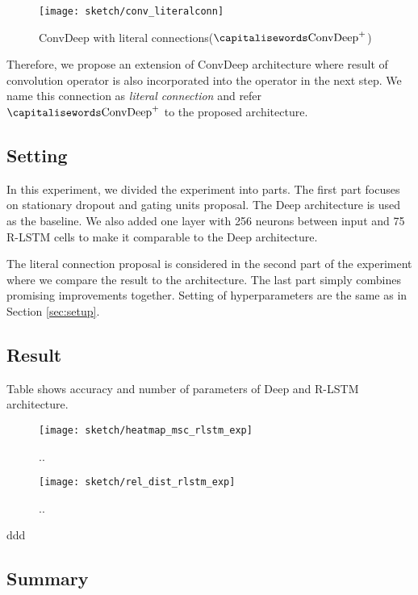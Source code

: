  \begin{figure}[h]
\centering
\texttt{[image: sketch/conv\_literalconn]}
\caption{ConvDeep with literal connections($\rnncell{ConvDeep}^+$)} 
\label{fig:conv_literalconn}
\end{figure}

Therefore, we propose an extension of ConvDeep architecture where result of convolution operator is also incorporated into the operator in the next step. We name this connection as \textit{literal connection} and refer $\rnncell{ConvDeep}^+$ to the proposed architecture. 

\subsection{Setting}
In this experiment, we divided the experiment into  parts. The first part focuses on stationary dropout and gating units proposal. The Deep architecture is used as the baseline. We also added one layer with 256 neurons between input and  75 R-LSTM cells to make it comparable to the Deep architecture.

The literal connection proposal is considered in the second part of the experiment where we compare the result to the  architecture.  The last part simply combines promising improvements together.  Setting of hyperparameters are the same as in Section \ref{sec:setup}.

\subsection{Result}
Table shows accuracy and number of parameters of Deep and R-LSTM architecture. 

 \begin{figure}[h]
\centering
\texttt{[image: sketch/heatmap\_msc\_rlstm\_exp]}
\caption{..} 
\label{fig:heatmap_msc_rlstm_exp}
\end{figure}

 \begin{figure}[h]
\centering
\texttt{[image: sketch/rel\_dist\_rlstm\_exp]}
\caption{..} 
\label{fig:rel_dist_rlstm_exp}
\end{figure}


ddd

\subsection{Summary}